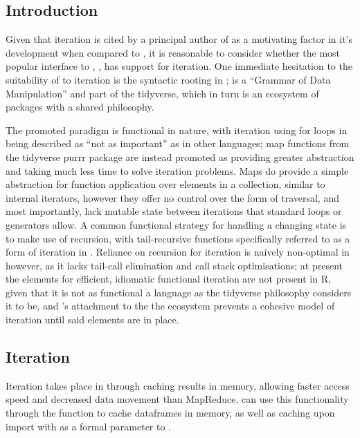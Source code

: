 \subsection{Introduction}\label{subsec:sparklyr-introduction}

Given that iteration is cited by a principal author of  as a
motivating factor in it's development when compared to , it is
reasonable to consider whether the most popular \R interface to ,
, has support for iteration\cites{zaharia2010spark,luraschi20}.
One immediate hesitation to the suitability of  to iteration is
the syntactic rooting in ;  is a ``Grammar of Data
Manipulation'' and part of the tidyverse, which in turn is an ecosystem
of packages with a shared philosophy\cite{wickham2019welcome}\cite{wickham2016r}.

The promoted paradigm is functional in nature, with iteration using for
loops in \R being described as ``not as important'' as in other
languages; map functions from the tidyverse purrr package are instead
promoted as providing greater abstraction and taking much less time to
solve iteration problems. Maps do provide a simple abstraction for
function application over elements in a collection, similar to internal
iterators, however they offer no control over the form of traversal, and
most importantly, lack mutable state between iterations that standard
loops or generators allow\cite{cousineau1998functional}. A common
functional strategy for handling a changing state is to make use of
recursion, with tail-recursive functions specifically referred to as a
form of iteration in \cite{abelson1996structure}. Reliance on recursion
for iteration is naively non-optimal in \R however, as it lacks tail-call
elimination and call stack optimisations\cite{rcore2020lang}; at present
the elements for efficient, idiomatic functional iteration are not
present in R, given that it is not as functional a language as the
tidyverse philosophy considers it to be, and 's attachment to
the the ecosystem prevents a cohesive model of iteration until said
elements are in place.

\subsection{Iteration}\label{iteration}

Iteration takes place in  through caching results in memory,
allowing faster access speed and decreased data movement than
MapReduce\cite{zaharia2010spark}.  can use this functionality
through the  function to
cache  dataframes in memory, as well as caching upon import with
 as a formal parameter to .

